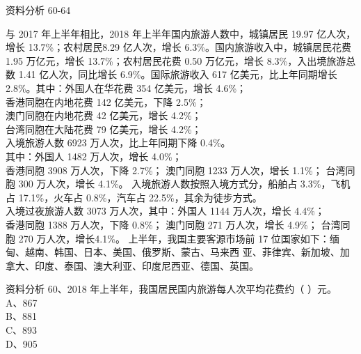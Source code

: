 \documentclass[aspectratio=169]{beamer}
\begin{document}
  \begin{frame}[t]{资料分析}
      60-64\\
      {\scriptsize
      与 2017 年上半年相比，2018 年上半年国内旅游人数中，城镇居民 19.97 亿人次，增长 13.7\%；农村居民8.29 亿人次，增长 6.3\%。国内旅游收入中，城镇居民花费 1.95 万亿元，增长 13.7\%；农村居民花费 0.50 万亿元，增长 8.3\%，入出境旅游总数 1.41 亿人次，同比增长 6.9\%。国际旅游收入 617 亿美元，比上年同期增长 2.8\%。其中：外国人在华花费 354 亿美元，增长 4.6\%；\\

      香港同胞在内地花费 142 亿美元，下降 2.5\%；\\
      澳门同胞在内地花费 42 亿美元，增长 4.2\%；\\
      台湾同胞在大陆花费 79 亿美元，增长 4.2\%；\\
      入境旅游人数 6923 万人次，比上年同期下降 0.4\%。\\
      其中：外国人 1482 万人次，增长 4.0\%；\\
      香港同胞 3908 万人次，下降 2.7\%；
      澳门同胞 1233 万人次，增长 1.1\%；
      台湾同胞 300 万人次，增长 4.1\%。
      入境旅游人数按照入境方式分，船舶占 3.3\%，飞机占 17.1\%，火车占 0.8\%，汽车占 22.5\%，其余为徒步方式。\\
      入境过夜旅游人数 3073 万人次，其中：外国人 1144 万人次，增长 4.4\%；\\
      香港同胞 1388 万人次，下降 0.8\%；
      澳门同胞 271 万人次，增长 4.9\%；
      台湾同胞 270 万人次，增长4.1\%。
      上半年，我国主要客源市场前 17 位国家如下：缅甸、越南、韩国、日本、美国、俄罗斯、蒙古、马来西
      亚、菲律宾、新加坡、加拿大、印度、泰国、澳大利亚、印度尼西亚、德国、英国。

      }
  \end{frame}                           



  \begin{frame}[t]{资料分析}
      60、2018 年上半年，我国居民国内旅游每人次平均花费约（ ）元。   \\
      A、867                                                         \\
      B、881                                                         \\
      C、893                                                         \\
      D、905                                                         \\
  \end{frame}                           
\end{document}
